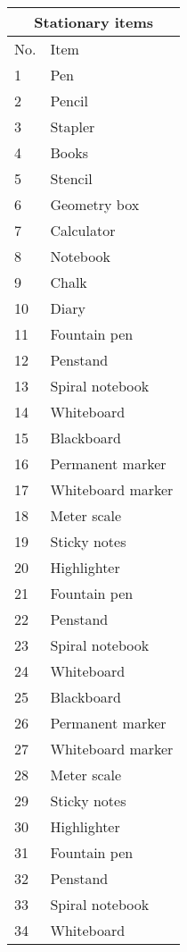 \documentclass{article}
\begin{document}
	\begin{longtable}{|l|l|}
		\hline
		\multicolumn{2}{|c|}{Stationary items}\\
		\hline
		No. & Item \\
		\hline
		\endhead
		1 & Pen \\
		\hline
		2 & Pencil \\
		\hline
		3 & Stapler \\
		\hline
		4 & Books \\
		\hline
		5 & Stencil \\
		\hline
		6 & Geometry box \\
		\hline
		7 & Calculator \\
		\hline
		8 & Notebook \\
		\hline
		9 & Chalk \\
		\hline
		10 & Diary \\
		\hline
		11 & Fountain pen \\
		\hline
		12 & Penstand \\
		\hline
		13 & Spiral notebook \\
		\hline
		14 & Whiteboard \\
		\hline
		15 & Blackboard \\
		\hline
		16 & Permanent marker \\
		\hline
		17 & Whiteboard marker \\
		\hline
		18 & Meter scale \\
		\hline
		19 & Sticky notes \\
		\hline
		20 & Highlighter \\
		\hline
		21 & Fountain pen \\
		\hline
		22 & Penstand \\
		\hline
		23 & Spiral notebook \\
		\hline
		24 & Whiteboard \\
		\hline
		25 & Blackboard \\
		\hline
		26 & Permanent marker \\
		\hline
		27 & Whiteboard marker \\
		\hline
		28 & Meter scale \\
		\hline
		29 & Sticky notes \\
		\hline
		30 & Highlighter \\
		\hline
		31 & Fountain pen \\
		\hline
		32 & Penstand \\
		\hline
		33 & Spiral notebook \\
		\hline
		34 & Whiteboard \\

\end{longtable}
\end{document}
